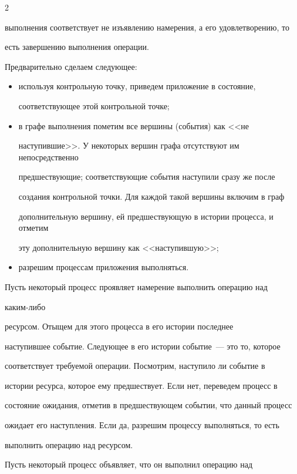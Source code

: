 \begin{multicols}{2}
{выполнения соответствует не изъявлению намерения, а его удовлетворению, то

есть завершению выполнения операции.



Предварительно сделаем следующее:

\begin{itemize}

\item используя контрольную точку, приведем приложение в состояние,

соответствующее этой контрольной точке;

\item в графе выполнения пометим все вершины (события) как <<не

наступившие>>. У некоторых вершин графа отсутствуют им непосредственно

предшествующие; соответствующие события наступили сразу же  после

создания контрольной точки. Для каж\-дой такой вершины включим в граф

дополнительную вершину, ей пред\-шес\-т\-ву\-ющую в истории процесса, и отметим

эту дополнительную вершину как <<наступившую>>;

\item разрешим процессам приложения выполняться.

\end{itemize}



Пусть некоторый процесс проявляет намерение выполнить операцию над

каким-либо

 ресурсом. Отыщем для этого процесса в его истории последнее

наступившее событие. Следующее в его истории событие~--- это то, которое

соответствует требуемой операции. По\-смот\-рим, наступило ли событие в

истории ресурса, которое ему пред\-шес\-т\-ву\-ет. Если нет, переведем процесс в

состояние ожидания, отметив в предшествующем событии, что данный процесс

ожидает его наступления. Если да, разрешим процессу выполняться, то есть

выполнить операцию над ресурсом.



Пусть некоторый процесс объявляет, что он выполнил операцию над

}
\end{multicols}
